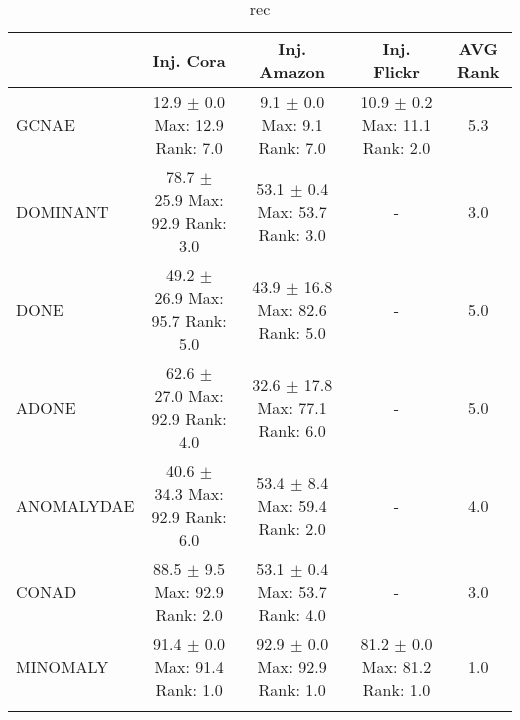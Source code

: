 \begin{longtable}{|l|c|c|c|c|}
\hline
 & Inj. Cora & Inj. Amazon & Inj. Flickr & AVG Rank \\ \hline
GCNAE & \makecell{ 12.9 $\pm$ 0.0 \\ \scriptsize Max: 12.9 \\ \scriptsize Rank: 7.0 } & \makecell{ 9.1 $\pm$ 0.0 \\ \scriptsize Max: 9.1 \\ \scriptsize Rank: 7.0 } & \makecell{ 10.9 $\pm$ 0.2 \\ \scriptsize Max: 11.1 \\ \scriptsize Rank: 2.0 } & 5.3 \\ \hline 
DOMINANT & \makecell{ 78.7 $\pm$ 25.9 \\ \scriptsize Max: 92.9 \\ \scriptsize Rank: 3.0 } & \makecell{ 53.1 $\pm$ 0.4 \\ \scriptsize Max: 53.7 \\ \scriptsize Rank: 3.0 } & - & 3.0 \\ \hline 
DONE & \makecell{ 49.2 $\pm$ 26.9 \\ \scriptsize Max: 95.7 \\ \scriptsize Rank: 5.0 } & \makecell{ 43.9 $\pm$ 16.8 \\ \scriptsize Max: 82.6 \\ \scriptsize Rank: 5.0 } & - & 5.0 \\ \hline 
ADONE & \makecell{ 62.6 $\pm$ 27.0 \\ \scriptsize Max: 92.9 \\ \scriptsize Rank: 4.0 } & \makecell{ 32.6 $\pm$ 17.8 \\ \scriptsize Max: 77.1 \\ \scriptsize Rank: 6.0 } & - & 5.0 \\ \hline 
ANOMALYDAE & \makecell{ 40.6 $\pm$ 34.3 \\ \scriptsize Max: 92.9 \\ \scriptsize Rank: 6.0 } & \makecell{ 53.4 $\pm$ 8.4 \\ \scriptsize Max: 59.4 \\ \scriptsize Rank: 2.0 } & - & 4.0 \\ \hline 
CONAD & \makecell{ 88.5 $\pm$ 9.5 \\ \scriptsize Max: 92.9 \\ \scriptsize Rank: 2.0 } & \makecell{ 53.1 $\pm$ 0.4 \\ \scriptsize Max: 53.7 \\ \scriptsize Rank: 4.0 } & - & 3.0 \\ \hline 
MINOMALY & \makecell{ 91.4 $\pm$ 0.0 \\ \scriptsize Max: 91.4 \\ \scriptsize Rank: 1.0 } & \makecell{ 92.9 $\pm$ 0.0 \\ \scriptsize Max: 92.9 \\ \scriptsize Rank: 1.0 } & \makecell{ 81.2 $\pm$ 0.0 \\ \scriptsize Max: 81.2 \\ \scriptsize Rank: 1.0 } & 1.0 \\ \hline 
\caption{ rec } \label{tab:rec}
\end{longtable}
